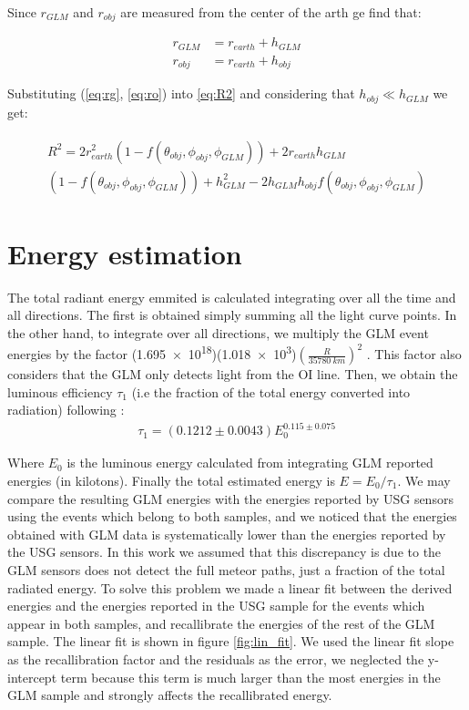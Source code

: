 Since $r_{GLM}$ and $r_{obj}$ are measured from the center of the arth ge find that:

\begin{align}
  r_{GLM} &= r_{earth} + h_{GLM} \label{eq:rg}\\
  r_{obj} &= r_{earth} + h_{obj} \label{eq:ro}
\end{align}

Substituting (\ref{eq:rg}, \ref{eq:ro}) into \ref{eq:R2} and considering that $h_{obj} \ll h_{GLM}$ we get:

\begin{align}
  \begin{split}
    R^2 = 2r_{earth}^2\left(1-f(\theta_{obj}, \phi_{obj}, \phi_{GLM})\right) +2r_{earth}h_{GLM}\\
    \left(1-f(\theta_{obj}, \phi_{obj}, \phi_{GLM})\right) + h_{GLM}^2 - 2h_{GLM}h_{obj}f(\theta_{obj}, \phi_{obj}, \phi_{GLM})
    \end{split}
\end{align}

\section{Energy estimation}
\label{app:energy}
The total radiant energy emmited is calculated integrating over all the time and all directions. The first is obtained simply summing all the light curve points. In the other hand, to integrate over all directions, we multiply the GLM event energies by the factor (\SI{1.695e18}{})(\SI{1.018e3}{})$\left(\frac{R}{35780~km}\right)^2$ \citep{Jenniskens:2018}. This factor also considers that the GLM only detects light from the OI line. Then, we obtain the luminous efficiency $\tau_1$ (i.e the fraction of the total energy converted into radiation) following \citet{Brown:2002}:
\begin{align}
  \tau_1 = (0.1212\pm 0.0043)E_0^{0.115\pm 0.075}
\end{align}

Where $E_0$ is the luminous energy calculated from integrating GLM reported energies (in kilotons). Finally the total estimated energy is $E = E_0/\tau_1$. We may compare the resulting GLM energies with the energies reported by USG sensors using the events which belong to both samples, and we noticed that the energies obtained with GLM data is systematically lower than the energies reported by the USG sensors. In this work we assumed that this discrepancy is due to the GLM sensors does not detect the full meteor paths, just a fraction of the total radiated energy. To solve this problem we made a linear fit between the derived energies and the energies reported in the USG sample for the events which appear in both samples, and recallibrate the energies of the rest of the GLM sample. The linear fit is shown in figure \ref{fig:lin_fit}. We used the linear fit slope as the recallibration factor and the residuals as the error, we neglected the y-intercept term because this term is much larger than the most energies in the GLM sample and strongly affects the recallibrated energy.

